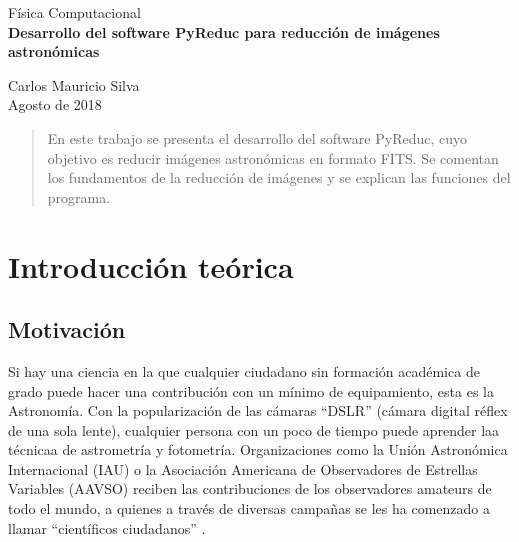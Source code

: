 \documentclass[a4paper, 12pt]{article}
\begin{document}
\begin{titlepage}
\vspace{0.5cm}

\begin{center}
\normalsize{\sc Física Computacional}\\
\vspace{0.5cm}
\Large{\bf Desarrollo del software PyReduc para reducción de imágenes astronómicas}\\


\vspace{5cm}

\normalsize
Carlos Mauricio Silva\\

\vspace*{0.5cm}
\small{Agosto de 2018}

\vspace*{3cm}

\begin{abstract}
  En este trabajo se presenta el desarrollo del software PyReduc, cuyo objetivo es reducir imágenes astronómicas en formato FITS. Se comentan los fundamentos de la reducción de imágenes y se explican las funciones del programa.
\end{abstract}

\vspace{5cm}

\normalsize

\end{center}
\end{titlepage}


\pagestyle{fancy}
\renewcommand{\footrulewidth}{0.6pt}


\section{Introducción teórica}
\subsection{Motivación}
Si hay una ciencia en la que cualquier ciudadano sin formación académica de grado puede hacer una contribución con un mínimo de equipamiento, esta es la Astronomía. Con la popularización de las cámaras ``DSLR'' (cámara digital réflex de una sola lente), cualquier persona con un poco de tiempo puede aprender laa técnicaa de astrometría y fotometría. Organizaciones como la Unión Astronómica Internacional (IAU) o la Asociación Americana de Observadores de Estrellas Variables (AAVSO) reciben las contribuciones de los observadores amateurs de todo el mundo, a quienes a través de diversas campañas se les ha comenzado a llamar ``científicos ciudadanos'' \cite{aavso}.
\end{document}
